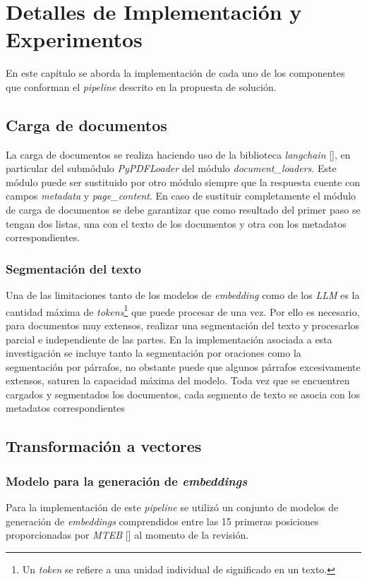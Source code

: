 \chapter{Detalles de Implementación y Experimentos}\label{chapter:implementation}
En este capítulo se aborda la implementación de cada uno de los componentes que conforman el \emph{pipeline}
descrito en la propuesta de solución.

\section{Carga de documentos}
La carga de documentos se realiza haciendo uso de la biblioteca \emph{langchain} [\cite{langchain}],
en particular del submódulo \emph{PyPDFLoader} del módulo \emph{document\_loaders}. Este módulo puede ser sustituido por otro módulo siempre que la respuesta cuente con campos \emph{metadata} y \emph{page\_content}. En caso de sustituir completamente el módulo de carga de documentos se debe garantizar que como resultado del primer paso se tengan dos listas, una con el texto de los documentos y otra con los metadatos correspondientes.
    \subsection{Segmentación del texto}
        Una de las limitaciones tanto de los modelos de \emph{embedding} como de los \emph{LLM} es la cantidad máxima de \emph{tokens}\footnote{Un \emph{token} se refiere a una unidad individual de significado en un texto.} que puede procesar de una vez. Por ello es necesario, para documentos muy extensos, realizar una segmentación del texto y procesarlos parcial e independiente de las partes.
        En la implementación asociada a esta investigación se incluye tanto la segmentación por oraciones como la segmentación por párrafos, no obstante puede que algunos párrafos excesivamente extensos, saturen la capacidad máxima del modelo. Toda vez que se encuentren cargados y segmentados los documentos, cada segmento de texto se asocia con los metadatos correspondientes

\section{Transformación a vectores}
    \subsection{Modelo para la generación de \emph{embeddings}}
        Para la implementación de este \emph{pipeline} se utilizó un conjunto de modelos de generación de \emph{embeddings} comprendidos entre las 15 primeras posiciones proporcionadas por \emph{MTEB} [\cite{leaderboard}] al momento de la revisión.

